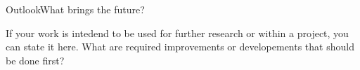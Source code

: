 \begin{frame}[t]{Outlook}{What brings the future?}

If your work is intedend to be used for further research or within a project, you can state it here. What are required improvements or developements that should be done first?
    
\end{frame}